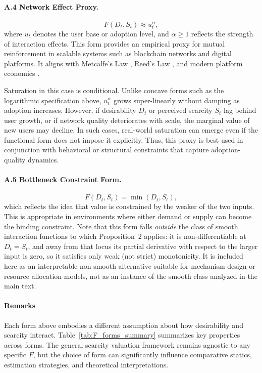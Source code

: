 \documentclass[12pt]{article}
\begin{document}
\paragraph{A.4 Network Effect Proxy.}  
\begin{equation}
F(D_t, S_t) \approx u_t^\alpha,
\tag{A.4}
\end{equation}
where \( u_t \) denotes the user base or adoption level, and \( \alpha \geq 1 \) reflects the strength of interaction effects. This form provides an empirical proxy for mutual reinforcement in scalable systems such as blockchain networks and digital platforms. It aligns with Metcalfe’s Law \citep{metcalfe1995metcalfe}, Reed’s Law \citep{reed2001law}, and modern platform economics \citep{evans2003two, rochet2006two, cong2019blockchain}.

Saturation in this case is conditional. Unlike concave forms such as the logarithmic specification above, \( u_t^\alpha \) grows super-linearly without damping as adoption increases. However, if desirability \( D_t \) or perceived scarcity \( S_t \) lag behind user growth, or if network quality deteriorates with scale, the marginal value of new users may decline. In such cases, real-world saturation can emerge even if the functional form does not impose it explicitly. Thus, this proxy is best used in conjunction with behavioral or structural constraints that capture adoption-quality dynamics.

\paragraph{A.5 Bottleneck Constraint Form.}  
\begin{equation}
F(D_t, S_t) = \min(D_t, S_t),
\tag{A.5}
\end{equation}
which reflects the idea that value is constrained by the weaker of the two inputs. This is appropriate in environments where either demand or supply can become the binding constraint. Note that this form falls \emph{outside} the class of smooth interaction functions to which Proposition~2 applies: it is non-differentiable at \( D_t = S_t \), and away from that locus its partial derivative with respect to the larger input is zero, so it satisfies only weak (not strict) monotonicity. It is included here as an interpretable non-smooth alternative suitable for mechanism design or resource allocation models, not as an instance of the smooth class analyzed in the main text.


\paragraph{Remarks}
Each form above embodies a different assumption about how desirability and scarcity interact. Table~\ref{tab:F_forms_summary} summarizes key properties across forms. The general scarcity valuation framework remains agnostic to any specific \( F \), but the choice of form can significantly influence comparative statics, estimation strategies, and theoretical interpretations.
\end{document}
